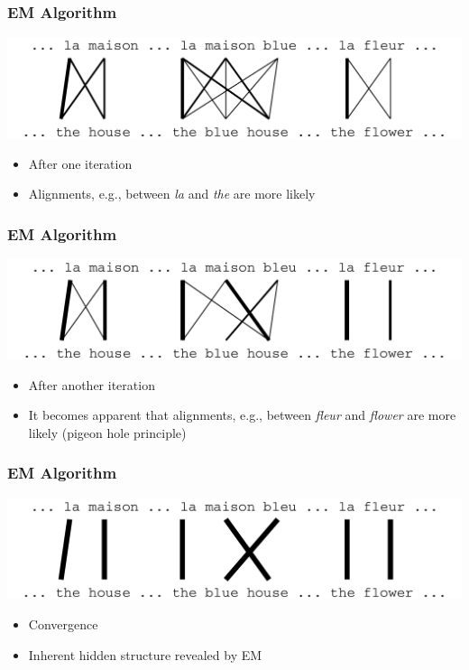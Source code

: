 \begin{frame}
\frametitle{EM Algorithm\koehnref}
\begin{center}
\includegraphics[scale=0.4]{figures/em2.pdf}
\end{center}
\begin{itemize}
\item After one iteration
\item Alignments, e.g., between \textit{la} and \textit{the} are more likely
\end{itemize}

\end{frame}

\begin{frame}
\frametitle{EM Algorithm\koehnref}
\begin{center}
\includegraphics[scale=0.4]{figures/em3.pdf}
\end{center}
\begin{itemize}
\item After another iteration
\item It becomes apparent that alignments, e.g., between \textit{fleur}
  and \textit{flower} are more likely (pigeon hole principle)
\end{itemize}

\end{frame}

\begin{frame}
\frametitle{EM Algorithm\koehnref}

\begin{center}
\includegraphics[scale=0.4]{figures/em4.pdf}
\end{center}
\begin{itemize}
\item Convergence
\item Inherent hidden structure revealed by EM
\end{itemize}

\end{frame}

